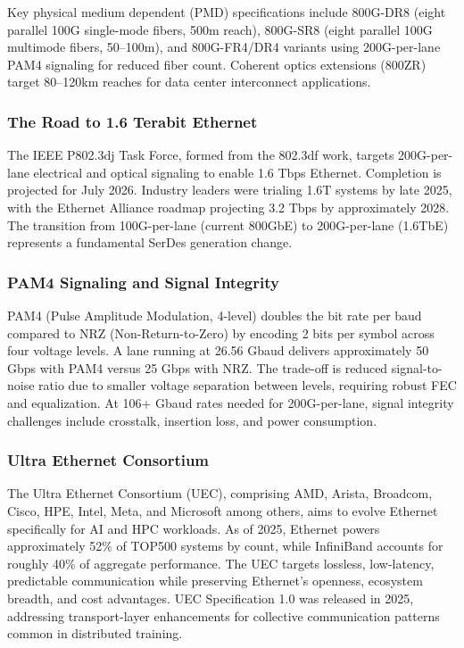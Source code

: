\documentclass[11pt,letterpaper]{article}
\begin{document}
Key physical medium dependent (PMD) specifications include 800G-DR8 (eight parallel 100G single-mode fibers, 500m reach), 800G-SR8 (eight parallel 100G multimode fibers, 50--100m), and 800G-FR4/DR4 variants using 200G-per-lane PAM4 signaling for reduced fiber count. Coherent optics extensions (800ZR) target 80--120km reaches for data center interconnect applications.

\subsubsection{The Road to 1.6 Terabit Ethernet}

The IEEE P802.3dj Task Force, formed from the 802.3df work, targets 200G-per-lane electrical and optical signaling to enable 1.6 Tbps Ethernet. Completion is projected for July 2026. Industry leaders were trialing 1.6T systems by late 2025, with the Ethernet Alliance roadmap projecting 3.2 Tbps by approximately 2028. The transition from 100G-per-lane (current 800GbE) to 200G-per-lane (1.6TbE) represents a fundamental SerDes generation change.

\subsubsection{PAM4 Signaling and Signal Integrity}

PAM4 (Pulse Amplitude Modulation, 4-level) doubles the bit rate per baud compared to NRZ (Non-Return-to-Zero) by encoding 2 bits per symbol across four voltage levels. A lane running at 26.56 Gbaud delivers approximately 50 Gbps with PAM4 versus 25 Gbps with NRZ. The trade-off is reduced signal-to-noise ratio due to smaller voltage separation between levels, requiring robust FEC and equalization. At 106+ Gbaud rates needed for 200G-per-lane, signal integrity challenges include crosstalk, insertion loss, and power consumption.

\subsubsection{Ultra Ethernet Consortium}

The Ultra Ethernet Consortium (UEC), comprising AMD, Arista, Broadcom, Cisco, HPE, Intel, Meta, and Microsoft among others, aims to evolve Ethernet specifically for AI and HPC workloads. As of 2025, Ethernet powers approximately 52\% of TOP500 systems by count, while InfiniBand accounts for roughly 40\% of aggregate performance. The UEC targets lossless, low-latency, predictable communication while preserving Ethernet's openness, ecosystem breadth, and cost advantages. UEC Specification 1.0 was released in 2025, addressing transport-layer enhancements for collective communication patterns common in distributed training.
\end{document}

